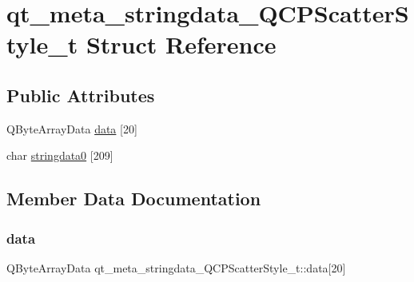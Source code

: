 \hypertarget{structqt__meta__stringdata___q_c_p_scatter_style__t}{}\section{qt\+\_\+meta\+\_\+stringdata\+\_\+\+Q\+C\+P\+Scatter\+Style\+\_\+t Struct Reference}
\label{structqt__meta__stringdata___q_c_p_scatter_style__t}
\subsection*{Public Attributes}
\begin{DoxyCompactItemize}
\item 
Q\+Byte\+Array\+Data \mbox{\hyperlink{structqt__meta__stringdata___q_c_p_scatter_style__t_a77fa79c979d9c182e73ce6682743d589}{data}} \mbox{[}20\mbox{]}
\item 
char \mbox{\hyperlink{structqt__meta__stringdata___q_c_p_scatter_style__t_ae1144a7c64135e0b0d3542f637020ee3}{stringdata0}} \mbox{[}209\mbox{]}
\end{DoxyCompactItemize}


\subsection{Member Data Documentation}
\mbox{\label{structqt__meta__stringdata___q_c_p_scatter_style__t_a77fa79c979d9c182e73ce6682743d589}} 
\subsubsection{\texorpdfstring{data}{data}}
{\footnotesize\ttfamily Q\+Byte\+Array\+Data qt\+\_\+meta\+\_\+stringdata\+\_\+\+Q\+C\+P\+Scatter\+Style\+\_\+t\+::data\mbox{[}20\mbox{]}}

\mbox{\label{structqt__meta__stringdata___q_c_p_scatter_style__t_ae1144a7c64135e0b0d3542f637020ee3}} 

